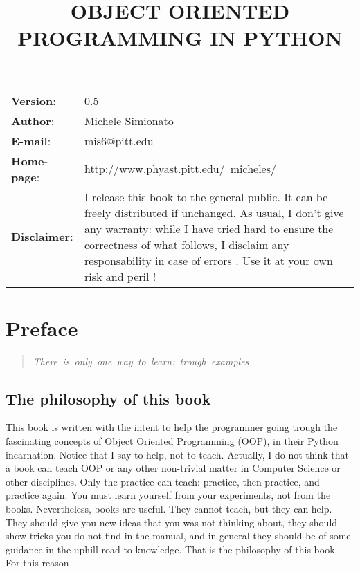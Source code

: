 \documentclass[11pt,english]{book}
\title{OBJECT ORIENTED PROGRAMMING IN PYTHON}
\author{}
\date{}
\newlength{\docinfowidth}
\begin{document}
\maketitle

\begin{center}
\begin{tabularx}{\docinfowidth}{lX}
\textbf{Version}: &
	0.5 \\
\textbf{Author}: &
	Michele Simionato \\
\textbf{E-mail}: &
	mis6@pitt.edu \\
\textbf{Home-page}: &
	http://www.phyast.pitt.edu/~micheles/ \\
\textbf{Disclaimer}: &
	I release this book to the general public. 
It can be freely distributed if unchanged.
As usual, I don't give any warranty: while I have tried hard to ensure the
correctness of what follows, I disclaim any responsability in case of
errors . Use it at your own risk and peril ! \\
\end{tabularx}
\end{center}



\tableofcontents

\bigskip
\setcounter{chapter}{-1}


\hypertarget{preface}{}
\chapter{Preface}
\begin{quote}
\begin{flushleft}
\emph{There~is~only~one~way~to~learn:~trough~examples}
\end{flushleft}
\end{quote}



\hypertarget{the-philosophy-of-this-book}{}
\section{The philosophy of this book}

This book is written with the intent to help the programmer going trough
the fascinating concepts of Object Oriented Programming (OOP), in their
Python incarnation. Notice that I say to help, not to teach. Actually,
I do not think that a book can teach OOP or any other non-trivial matter 
in Computer Science or other disciplines. Only the
practice can teach: practice, then practice, and practice again. 
You must learn yourself from your experiments, not from the books. 
Nevertheless, books are useful. They cannot teach, but they can help. 
They should give you new ideas that you was not thinking about, they should
show tricks you do not find in the manual, and in general they should be of
some guidance in the uphill road to knowledge. That is the philosophy
of this book. For this reason
\end{document}
